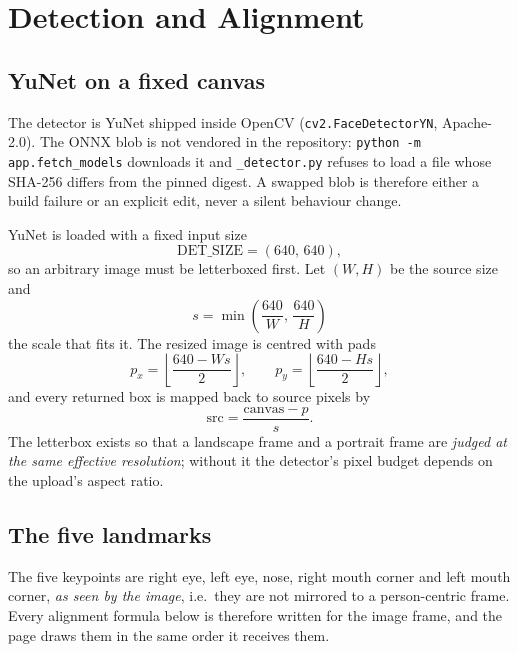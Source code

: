 \documentclass[11pt,a4paper]{article}
\newcommand{\coden}[1]{\texttt{\small #1}}
\begin{document}
\section{Detection and Alignment}
\label{sec:detection}

\subsection{YuNet on a fixed canvas}

The detector is YuNet shipped inside OpenCV
(\coden{cv2.FaceDetectorYN}, Apache-2.0). The ONNX blob is not vendored
in the repository: \coden{python -m app.fetch\_models} downloads it and
\coden{\_detector.py} refuses to load a file whose SHA-256 differs from
the pinned digest. A swapped blob is therefore either a build failure or
an explicit edit, never a silent behaviour change.

YuNet is loaded with a fixed input size
\begin{equation}
  \mathrm{DET\_SIZE} = (640,\,640),
\end{equation}
so an arbitrary image must be letterboxed first. Let
$(W,H)$ be the source size and
\begin{equation}
  s = \min\!\left(\frac{640}{W},\,\frac{640}{H}\right)
\end{equation}
the scale that fits it. The resized image is centred with pads
\begin{equation}
  p_x = \left\lfloor\frac{640 - W s}{2}\right\rfloor,\qquad
  p_y = \left\lfloor\frac{640 - H s}{2}\right\rfloor,
\end{equation}
and every returned box is mapped back to source pixels by
\begin{equation}
  \text{src} = \frac{\text{canvas} - p}{s}.
  \label{eq:unletterbox}
\end{equation}
The letterbox exists so that a landscape frame and a portrait frame are
\emph{judged at the same effective resolution}; without it the detector's
pixel budget depends on the upload's aspect ratio.

\subsection{The five landmarks}

The five keypoints are right eye, left eye, nose, right mouth corner and
left mouth corner, \emph{as seen by the image}, i.e.\ they are not
mirrored to a person-centric frame. Every alignment formula below is
therefore written for the image frame, and the page draws them in the
same order it receives them.
\end{document}
